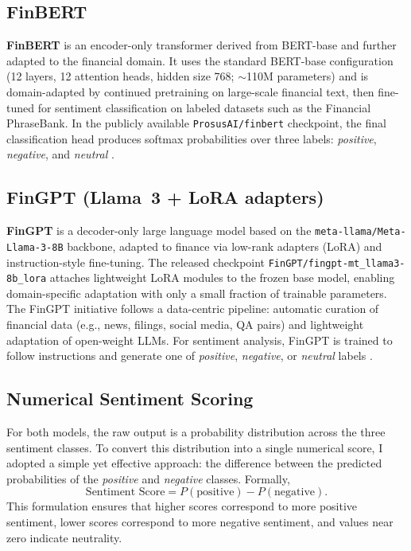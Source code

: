 \documentclass[12pt,a4paper]{report}
\begin{document}
\subsection{FinBERT}
\label{subsec:finbert}
\textbf{FinBERT} is an encoder-only transformer derived from BERT-base and further adapted to the financial domain. It uses the standard BERT-base configuration (12 layers, 12 attention heads, hidden size 768; $\sim$110M parameters) and is domain-adapted by continued pretraining on large-scale financial text, then fine-tuned for sentiment classification on labeled datasets such as the Financial PhraseBank. In the publicly available \texttt{ProsusAI/finbert} checkpoint, the final classification head produces softmax probabilities over three labels: \textit{positive}, \textit{negative}, and \textit{neutral} \cite{araci2019finbert}.

\subsection{FinGPT (Llama~3 + LoRA adapters)}
\label{subsec:fingpt}
\textbf{FinGPT} is a decoder-only large language model based on the \texttt{meta-llama/Meta-Llama-3-8B} backbone, adapted to finance via low-rank adapters (LoRA) and instruction-style fine-tuning. The released checkpoint \texttt{FinGPT/fingpt-mt\_llama3-8b\_lora} attaches lightweight LoRA modules to the frozen base model, enabling domain-specific adaptation with only a small fraction of trainable parameters. The FinGPT initiative follows a data-centric pipeline: automatic curation of financial data (e.g., news, filings, social media, QA pairs) and lightweight adaptation of open-weight LLMs. For sentiment analysis, FinGPT is trained to follow instructions and generate one of \textit{positive}, \textit{negative}, or \textit{neutral} labels \cite{yang2023fingpt}.

\subsection{Numerical Sentiment Scoring}
For both models, the raw output is a probability distribution across the three sentiment classes. To convert this distribution into a single numerical score, I adopted a simple yet effective approach: the difference between the predicted probabilities of the \textit{positive} and \textit{negative} classes. Formally,
\[
\text{Sentiment Score} = P(\text{positive}) - P(\text{negative}).
\]
This formulation ensures that higher scores correspond to more positive sentiment, lower scores correspond to more negative sentiment, and values near zero indicate neutrality.
\end{document}
